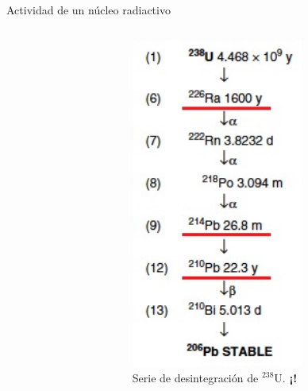 \documentclass[9pt]{beamer}
\newcommand{\UDosTresOcho}{$^{238}$U}
\begin{document}
\begin{frame}{Actividad de un núcleo radiactivo}
\begin{columns}
\begin{column}{0.68\textwidth}
		\end{column}
		\begin{column}{0.3\textwidth}  
			\justifying
			\begin{figure}
			\includegraphics[width=0.7\textwidth]{Imagenes/UDacay-2.jpg}
			\caption{\justifying Serie de desintegración de \UDosTresOcho\footnotemark[1].  \textbf{¡\hyperlink{EquilibrioSecular}{}!}}
			\end{figure}
		\end{column}
	\end{columns}
\end{frame}
\end{document}

